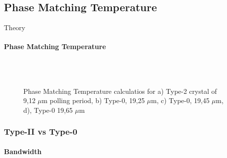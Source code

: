 \documentclass[serif,8pt]{beamer}
\begin{document}
{{\subsection{Phase Matching Temperature}
\begin{frame}{Theory}
	\framesubtitle{Phase Matching Temperature}
	\begin{figure}[!ht]
	  \centering
	  \caption{Phase Matching Temperature calculatios for a) Type-2 crystal of 9,12 $\mu$m polling period, b) Type-0, 19,25 $\mu$m, c) Type-0, 19,45 $\mu$m, d), Type-0 19,65 $\mu$m}
	  \quad
	  \\
	  \quad
	  \\
	  \label{fig:gratingstheory}
	\end{figure}
\end{frame}

\begin{frame}[t]
	\frametitle{Type-II vs Type-0}
	\framesubtitle{Bandwidth}


\end{frame}}}
\end{document}
